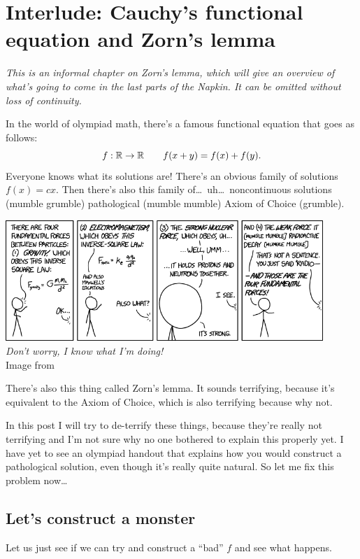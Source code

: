 \chapter{Interlude: Cauchy's functional equation and Zorn's lemma}
\label{ch:zorn}
\emph{This is an informal chapter on Zorn's lemma,
which will give an overview of what's going to come in the last parts of the Napkin.
It can be omitted without loss of continuity.}

\medskip

In the world of olympiad math, there's a famous functional equation that goes as follows: 
\[ f : \mathbb R \to \mathbb R \qquad f(x+y) = f(x) + f(y). \]
Everyone knows what its solutions are!
There's an obvious family of solutions $f(x) = cx$.
Then there's also this family of\dots\ uh\dots\ noncontinuous solutions (mumble grumble) pathological 
(mumble mumble) Axiom of Choice (grumble).

\begin{center}
	\includegraphics[width=12cm]{media/xkcd-fundamental-forces.png} \\[1em]
	\emph{Don't worry, I know what I'm doing!}
	\\ \scriptsize Image from \cite{img:xkcd}
\end{center}

There's also this thing called Zorn's lemma. It sounds terrifying,
because it's equivalent to the Axiom of Choice, which is also terrifying because why not.

In this post I will try to de-terrify these things,
because they're really not terrifying
and I'm not sure why no one bothered to explain this properly yet.
I have yet to see an olympiad handout that explains how you would construct
a pathological solution, even though it's really quite natural.
So let me fix this problem now\dots

\section{Let's construct a monster}
Let us just see if we can try and construct a ``bad'' $f$ and see what happens.


